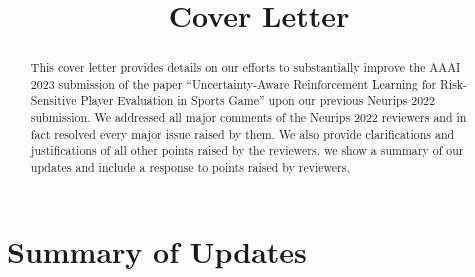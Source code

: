 \documentclass[letterpaper]{article} %
\title{Cover Letter}
\begin{document}
\maketitle

\author{}

\begin{abstract}
This cover letter provides details on our efforts to substantially improve the AAAI 2023 submission of the paper “Uncertainty-Aware Reinforcement Learning for Risk-Sensitive Player Evaluation in Sports Game” upon our previous Neurips 2022 submission. We addressed all major comments of the Neurips 2022 reviewers and in fact resolved every major issue raised by them. We also provide clarifications and justifications of all other points raised by the reviewers. we show a summary of our updates and include a response to points raised by reviewers,
\end{abstract}

\section{Summary of Updates}
\end{document}

